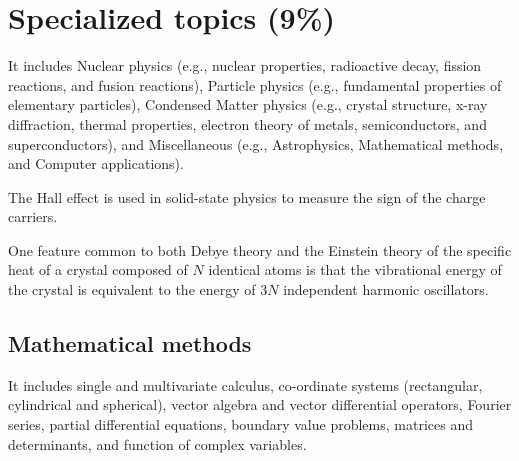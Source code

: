 
\section{Specialized topics (9\%)}

It includes Nuclear physics (e.g., nuclear properties, radioactive decay, fission reactions, and fusion reactions), Particle physics (e.g., fundamental properties of elementary particles), Condensed Matter physics (e.g., crystal structure, x-ray diffraction, thermal properties, electron theory of metals, semiconductors, and superconductors), and Miscellaneous (e.g., Astrophysics, Mathematical methods, and Computer applications). 



The Hall effect is used in solid-state physics to measure the sign of the charge carriers.

One feature common to both Debye theory and the Einstein theory of the specific heat of a crystal composed of $N$ identical atoms is that the vibrational energy of the crystal is equivalent to the energy of $3N$ independent harmonic oscillators.


\subsection{Mathematical methods}

It includes single and multivariate calculus, co-ordinate systems (rectangular, cylindrical and spherical), vector algebra and vector differential operators, Fourier series, partial differential equations, boundary value problems, matrices and determinants, and function of complex variables.



